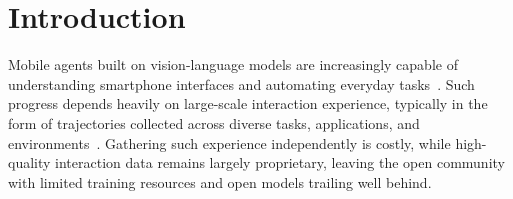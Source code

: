 
\section{Introduction}
\label{sec:intro}



Mobile agents built on vision-language models are increasingly capable of understanding smartphone interfaces and automating everyday tasks~\citep{wang2025ui, zhou2025mai, xu2026mobile, gao2026ui, zhou2026qwen}.
Such progress depends heavily on large-scale interaction experience, typically in the form of trajectories collected across diverse tasks, applications, and environments~\citep{cheng2026openmobile, team2026ui}. 
Gathering such experience independently is costly, while high-quality interaction data remains largely proprietary, leaving the open community with limited training resources and open models trailing well behind.

